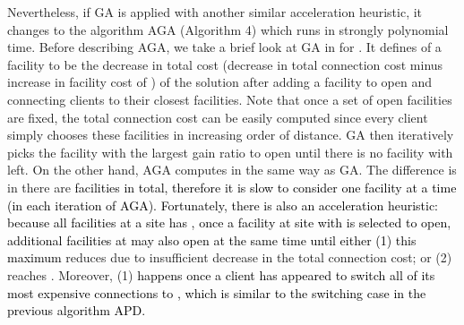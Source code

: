 \documentclass[10pt]{llncs}
\begin{document}
Nevertheless, if GA is applied with another similar acceleration heuristic,
it changes to the algorithm AGA\textit{ }(Algorithm 4) which runs
in strongly polynomial time. Before describing AGA, we take a brief
look at GA in \cite{Guha03FTFL2.41} for . It defines 
of a facility  to be the decrease in total cost (decrease in total
connection cost minus increase in facility cost of ) of the solution
after adding a facility  to open and connecting clients to their
closest facilities. Note that once a set of open facilities are fi{}xed,
the total connection cost can be easily computed since every client
simply chooses these facilities in increasing order of distance. GA
then iteratively picks the facility with the largest gain ratio 
to open until there is no facility  with 
left. On the other hand, AGA computes  in the
same way as GA. The difference is in  there are \textcolor{black}{
facilities in total, therefore it is slow to consider one facility
at a time (in each iteration of AGA). Fortunately, there is also an
acceleration heuristic: because all facilities at a site  has
, once a facility at site  with} \textcolor{black}{{}
is selected to open, additional facilities at  may also open
at the same time until either (1) this maximum} \textcolor{black}{}
reduces due to insufficient decrease in the total connection cost;
or (2)  reaches . Moreover, (1) \textcolor{black}{happens
once a client has appeared to switch all of its most expensive connections
to , which is similar to the switching case in the previous
algorithm APD.}
\end{document}
